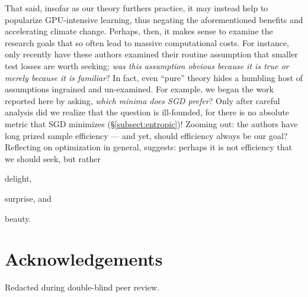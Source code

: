 \documentclass{article}
\theoremstyle{plain}
\theoremstyle{definition}
\begin{document}
    That said, insofar as our theory furthers practice, it may instead help to
    popularize GPU-intensive learning, thus negating the
    aforementioned benefits and accelerating climate change.
    Perhaps, then, it makes sense to examine the research goals that so often
    lead to massive computational costs.  For instance, only recently have
    these authors examined their routine assumption that smaller test losses
    are worth seeking; \emph{was this assumption obvious because it is true or
    merely because it is familiar}?
    In fact, even ``pure'' theory hides a humbling host of assumptions
    ingrained and un-examined.  For example, we began the work reported here by
    asking, \textit{which minima does SGD prefer}?  Only after careful analysis
    did we realize that the question is ill-founded, for there is no absolute
    metric that SGD minimizes (\S\ref{subsect:entropic})! 
    Zooming out: the authors have long prized sample efficiency --- and yet,
    should efficiency always be our goal?  Reflecting on
    optimization in general, \cite{ar19} suggests: perhaps it is not efficiency
    that we should seek, but rather
    \par \hfill delight, \phantom{surprise, and beauty.~~~~}
    \par \hfill surprise, and \phantom{beauty.~~}
    \par \hfill beauty.


\vfill
\section*{Acknowledgements}

    Redacted during double-blind peer review.
\end{document}
